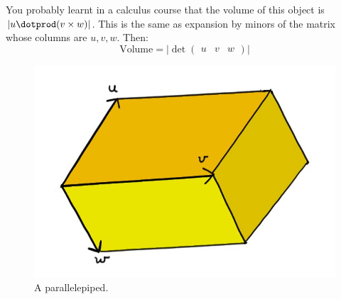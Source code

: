 You probably learnt in a  calculus course  that the volume of this object is $|u\dotprod (v\times w)|$.  This is the same as expansion by minors of the matrix whose columns are $u,v,w$.  Then:
\[
\text{Volume}=\big|\det \begin{pmatrix}u & v & w \end{pmatrix} \big|
\] 



\begin{figure}
\begin{center}
\includegraphics[scale=.4]{parallelepiped.jpg}
\caption{A parallelepiped.\label{parallelepiped}}
\end{center}
\end{figure}








